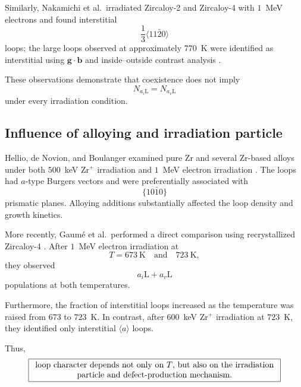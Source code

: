 \documentclass{article}
\newcommand{\aloop}{\ensuremath{\langle a\rangle}}
\newcommand{\aiL}{a_{i}\mathrm{L}}
\newcommand{\avL}{a_{v}\mathrm{L}}
\newcommand{\bvec}{\bm b}
\begin{document}
Similarly, Nakamichi et al.\ irradiated Zircaloy-2 and Zircaloy-4 with $1$~MeV
electrons and found interstitial
\begin{equation}
    \frac13\langle11\bar20\rangle
\end{equation}
loops; the large loops observed at approximately $770$~K were identified as
interstitial using $\bm g\!\cdot\!\bvec$ and inside--outside contrast analysis
\citep{nakamichi1997formation}.

These observations demonstrate that coexistence does not imply
\begin{equation}
    N_{\aiL}=N_{\avL}
\end{equation}
under every irradiation condition.

\subsection{Influence of alloying and irradiation particle}

Hellio, de Novion, and Boulanger examined pure Zr and several Zr-based alloys
under both $500$~keV Zr$^+$ irradiation and $1$~MeV electron irradiation
\citep{hellio1988influence}. The loops had $a$-type Burgers vectors and were
preferentially associated with
\begin{equation}
    \{10\bar10\}
\end{equation}
prismatic planes. Alloying additions substantially affected the loop density and
growth kinetics.

More recently, Gaum\'e et al.\ performed a direct comparison using
recrystallized Zircaloy-4 \citep{gaume2017microstructure}. After $1$~MeV
electron irradiation at
\begin{equation}
    T=673~\mathrm K
    \quad\text{and}\quad
    723~\mathrm K,
\end{equation}
they observed
\begin{equation}
    \boxed{
    \aiL+\avL
    }
\end{equation}
populations at both temperatures.

Furthermore, the fraction of interstitial loops increased as the temperature was
raised from $673$ to $723$~K. In contrast, after $600$~keV Zr$^+$ irradiation at
$723$~K, they identified only interstitial \aloop{} loops.

Thus,
\begin{equation}
    \boxed{\parbox{0.86\textwidth}{\centering loop character depends not only
    on $T$, but also on the irradiation particle and defect-production
    mechanism.}}
\end{equation}
\end{document}
